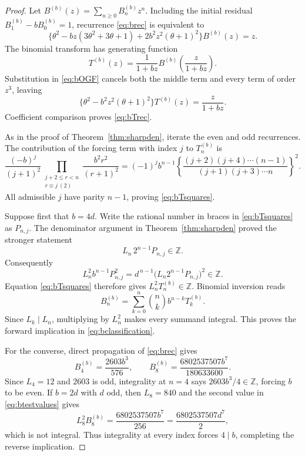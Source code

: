 \documentclass[11pt]{article}
\theoremstyle{definition}
\theoremstyle{remark}
\begin{document}
\begin{proof}
Let $B^{(b)}(z)=\sum_{n\ge0}B^{(b)}_nz^n$.  Including the initial residual
$B^{(b)}_1-bB^{(b)}_0=1$, recurrence \eqref{eq:brec} is equivalent to
\begin{equation}\label{eq:bOGF}
 \{\theta^2-bz(3\theta^2+3\theta+1)
       +2b^2z^2(\theta+1)^2\}B^{(b)}(z)=z.
\end{equation}
The binomial transform has generating function
\[
 T^{(b)}(z)=\frac1{1+bz}
 B^{(b)}\!\left(\frac z{1+bz}\right).
\]
Substitution in \eqref{eq:bOGF} cancels both the middle term and every term of order
$z^3$, leaving
\[
 \{\theta^2-b^2z^2(\theta+1)^2\}T^{(b)}(z)=\frac z{1+bz}.
\]
Coefficient comparison proves \eqref{eq:bTrec}.

As in the proof of Theorem~\ref{thm:sharpden}, iterate the even and odd recurrences.
The contribution of the forcing term with index $j$ to $T^{(b)}_n$ is
\[
 \frac{(-b)^j}{(j+1)^2}
 \prod_{\substack{j+2\le r<n\\r\equiv j\ (2)}}
 \frac{b^2r^2}{(r+1)^2}
 =(-1)^jb^{n-1}
 \left\{
 \frac{(j+2)(j+4)\cdots(n-1)}
      {(j+1)(j+3)\cdots n}
 \right\}^{\!2}.
\]
All admissible $j$ have parity $n-1$, proving \eqref{eq:bTsquares}.

Suppose first that $b=4d$.  Write the rational number in braces in
\eqref{eq:bTsquares} as $P_{n,j}$.  The denominator argument in
Theorem~\ref{thm:sharpden} proved the stronger statement
\[
 L_n\,2^{n-1}P_{n,j}\in\mathbb Z.
\]
Consequently
\[
 L_n^2b^{n-1}P_{n,j}^2
 =d^{\,n-1}\bigl(L_n2^{n-1}P_{n,j}\bigr)^2\in\mathbb Z.
\]
Equation \eqref{eq:bTsquares} therefore gives
$L_n^2T^{(b)}_n\in\mathbb Z$.  Binomial inversion reads
\[
 B^{(b)}_n=\sum_{k=0}^n\binom nkb^{n-k}T^{(b)}_k.
\]
Since $L_k\mid L_n$, multiplying by $L_n^2$ makes every summand integral.  This proves
the forward implication in \eqref{eq:bclassification}.

For the converse, direct propagation of \eqref{eq:brec} gives
\begin{equation}\label{eq:btestvalues}
 B^{(b)}_4=\frac{2603b^3}{576},\qquad
 B^{(b)}_8=\frac{6802537507b^7}{180633600}.
\end{equation}
Since $L_4=12$ and $2603$ is odd, integrality at $n=4$ says
$2603b^3/4\in\mathbb Z$, forcing $b$ to be even.  If $b=2d$ with $d$ odd, then
$L_8=840$ and the second value in \eqref{eq:btestvalues} gives
\[
 L_8^2B^{(b)}_8=\frac{6802537507b^7}{256}
 =\frac{6802537507d^7}{2},
\]
which is not integral.  Thus integrality at every index forces $4\mid b$, completing
the reverse implication.
\end{proof}
\end{document}

